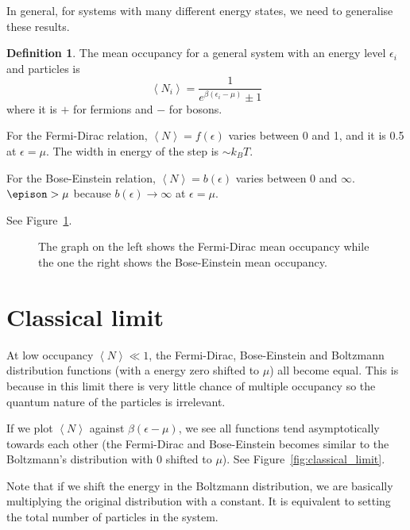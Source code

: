 \documentclass[12pt,chapterprefix=false,dvipsnames]{scrbook}
\theoremstyle{dotless}
\theoremstyle{definition}
\newtheorem{protodefinition}{Definition}[section]
\newenvironment{definition}
{\colorlet{shadecolor}{black!15}\begin{shaded}\begin{protodefinition}}
			{\end{protodefinition}\end{shaded}}
\begin{document}
In general, for systems with many different energy states, we
need to generalise these results.

\begin{definition}
	The mean occupancy for a general system with an energy level
	$\epsilon_i$ and particles is
	\begin{equation}
		\left<N_i\right>
		=
        \frac{1}{e^{\beta\left(\epsilon_i - \mu\right)}\pm 1}
	\end{equation}
	where it is $+$ for fermions and
	$-$ for bosons.

	For the Fermi-Dirac relation, $\left<N\right> = f\left(\epsilon\right)$ varies
	between 0 and 1, and it is 0.5 at $\epsilon =\mu$. The
	width in energy of the step is $\sim k_B T$.

	For the Bose-Einstein relation, $\left<N\right> = b\left(\epsilon\right)$ varies
	between 0 and $\infty$. $\epison > \mu$
	because $b\left(\epsilon\right) \rightarrow \infty$ at $\epsilon = \mu$.

	See Figure~\ref{fig:mean_occupancy}.
\end{definition}

\begin{figure}[htpb]
	\centering
	
	\caption{The graph on the left shows the Fermi-Dirac mean occupancy while
		the one the right shows the Bose-Einstein mean occupancy.}%
	\label{fig:mean_occupancy}
\end{figure}

\section{Classical limit}%
\label{sec:classical_limit}

At low occupancy $\left<N\right> \ll 1$, the Fermi-Dirac,
Bose-Einstein and Boltzmann distribution functions (with a
energy zero shifted to $\mu$) all become
equal. This is because in this limit there is very little chance
of multiple occupancy so the quantum nature of the particles is
irrelevant.

If we plot $\left<N\right>$ against
$\beta\left(\epsilon - \mu\right)$, we see all functions tend
asymptotically towards each other (the Fermi-Dirac and
Bose-Einstein becomes similar to the Boltzmann's distribution
with 0 shifted to $\mu$). See
Figure~\ref{fig:classical_limit}.

Note that if we shift the energy in the Boltzmann distribution,
we are basically multiplying the original distribution with a
constant. It is equivalent to setting the total number of
particles in the system.
\end{document}
